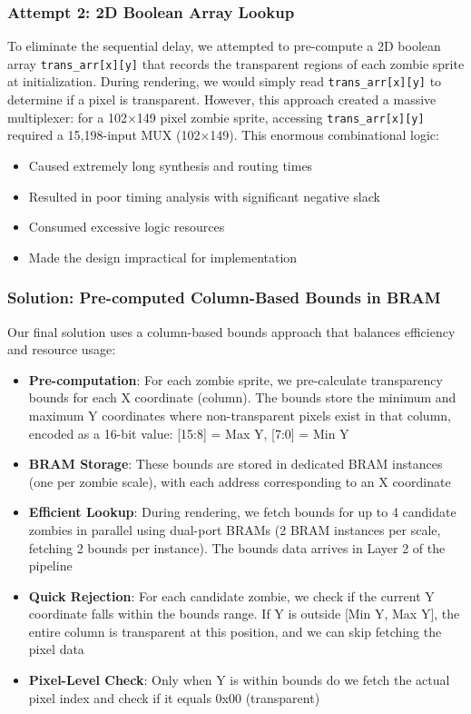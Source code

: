 \documentclass[12pt,a4paper]{article}
\begin{document}
\subsubsection{Attempt 2: 2D Boolean Array Lookup}
To eliminate the sequential delay, we attempted to pre-compute a 2D boolean array \texttt{trans\_arr[x][y]} that records the transparent regions of each zombie sprite at initialization. During rendering, we would simply read \texttt{trans\_arr[x][y]} to determine if a pixel is transparent. However, this approach created a massive multiplexer: for a 102×149 pixel zombie sprite, accessing \texttt{trans\_arr[x][y]} required a 15,198-input MUX (102×149). This enormous combinational logic:
\begin{itemize}
    \item Caused extremely long synthesis and routing times
    \item Resulted in poor timing analysis with significant negative slack
    \item Consumed excessive logic resources
    \item Made the design impractical for implementation
\end{itemize}

\subsubsection{Solution: Pre-computed Column-Based Bounds in BRAM}
Our final solution uses a column-based bounds approach that balances efficiency and resource usage:
\begin{itemize}
    \item \textbf{Pre-computation}: For each zombie sprite, we pre-calculate transparency bounds for each X coordinate (column). The bounds store the minimum and maximum Y coordinates where non-transparent pixels exist in that column, encoded as a 16-bit value: [15:8] = Max Y, [7:0] = Min Y
    \item \textbf{BRAM Storage}: These bounds are stored in dedicated BRAM instances (one per zombie scale), with each address corresponding to an X coordinate
    \item \textbf{Efficient Lookup}: During rendering, we fetch bounds for up to 4 candidate zombies in parallel using dual-port BRAMs (2 BRAM instances per scale, fetching 2 bounds per instance). The bounds data arrives in Layer 2 of the pipeline
    \item \textbf{Quick Rejection}: For each candidate zombie, we check if the current Y coordinate falls within the bounds range. If Y is outside [Min Y, Max Y], the entire column is transparent at this position, and we can skip fetching the pixel data
    \item \textbf{Pixel-Level Check}: Only when Y is within bounds do we fetch the actual pixel index and check if it equals 0x00 (transparent)
\end{itemize}
\end{document}
